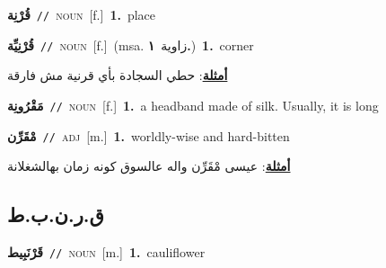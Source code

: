 \documentclass[10pt,a4paper,twoside]{article} %
\begin{document}
\begin{multicols}{2}
{\setlength\topsep{0pt}\textbf{\foreignlanguage{arabic}{قُرْنِة}}\ {\color{gray}\texttt{//}\color{black}}\ \textsc{noun}\ [f.]\ \textbf{1.}~place\ } \vspace{2mm}

{\setlength\topsep{0pt}\textbf{\foreignlanguage{arabic}{قُرْنِيِّة}}\ {\color{gray}\texttt{//}\color{black}}\ \textsc{noun}\ [f.]\ \color{gray}(msa. \foreignlanguage{arabic}{زاوية}~\foreignlanguage{arabic}{\textbf{١.}})\color{black}\ \textbf{1.}~corner\  \begin{flushright}\color{gray}\foreignlanguage{arabic}{\textbf{\underline{\foreignlanguage{arabic}{أمثلة}}}: حطي السجادة بأي قرنية مش فارقة}\end{flushright}\color{black}} \vspace{2mm}

{\setlength\topsep{0pt}\textbf{\foreignlanguage{arabic}{مَقْرُونِة}}\ {\color{gray}\texttt{//}\color{black}}\ \textsc{noun}\ [f.]\ \textbf{1.}~a headband made of silk. Usually, it is long\ } \vspace{2mm}

{\setlength\topsep{0pt}\textbf{\foreignlanguage{arabic}{مْقَرِّن}}\ {\color{gray}\texttt{//}\color{black}}\ \textsc{adj}\ [m.]\ \textbf{1.}~worldly-wise and hard-bitten\  \begin{flushright}\color{gray}\foreignlanguage{arabic}{\textbf{\underline{\foreignlanguage{arabic}{أمثلة}}}: عيسى مْقَرِّن واله عالسوق كونه زمان بهالشغلانة}\end{flushright}\color{black}} \vspace{2mm}

\vspace{-3mm}
\subsection*{\color{blue}\foreignlanguage{arabic}{ق.ر.ن.ب.ط}\color{blue}{ (ntws)}} 

{\setlength\topsep{0pt}\textbf{\foreignlanguage{arabic}{قَرْنَبِيط}}\ {\color{gray}\texttt{//}\color{black}}\ \textsc{noun}\ [m.]\ \textbf{1.}~cauliflower\ } \vspace{2mm}


\end{multicols}
\end{document}
